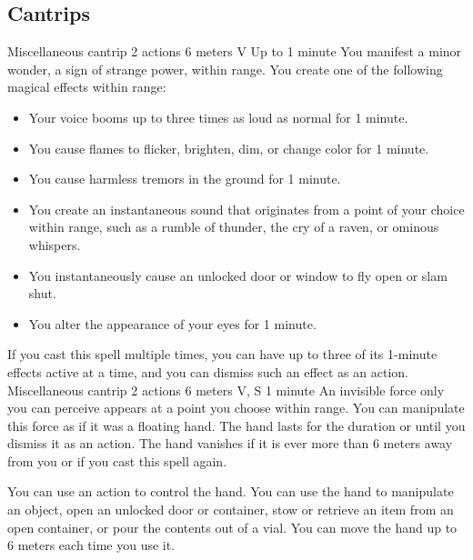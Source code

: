 \subsection*{Cantrips}
        {Miscellaneous cantrip}
        {2 actions}
        {6 meters}
        {V}
        {Up to 1 minute}
        You manifest a minor wonder, a sign of strange power, within range.
        You create one of the following magical effects within range:
        \begin{itemize}
            \item Your voice booms up to three times as loud as normal for 1 minute.
            \item You cause flames to flicker, brighten, dim, or change color for 1 minute.
            \item You cause harmless tremors in the ground for 1 minute.
            \item You create an instantaneous sound that originates from a point of your choice within range, such as a rumble of thunder, the cry of a raven, or ominous whispers.
            \item You instantaneously cause an unlocked door or window to fly open or slam shut.
            \item You alter the appearance of your eyes for 1 minute.
        \end{itemize}
        If you cast this spell multiple times, you can have up to three of its 1-minute effects active at a time, and you can dismiss such an effect as an action.
        {Miscellaneous cantrip}
        {2 actions}
        {6 meters}
        {V, S}
        {1 minute}
        An invisible force only you can perceive appears at a point you choose within range.
        You can manipulate this force as if it was a floating hand.
        The hand lasts for the duration or until you dismiss it as an action.
        The hand vanishes if it is ever more than 6 meters away from you or if you cast this spell again.

        You can use an action to control the hand.
        You can use the hand to manipulate an object, open an unlocked door or container, stow or retrieve an item from an open container, or pour the contents out of a vial.
        You can move the hand up to 6 meters each time you use it.

